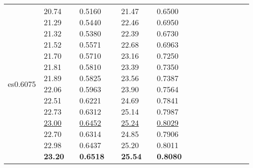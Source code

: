 \documentclass[runningheads]{llncs}
\begin{document}
\begin{table}[!ht]
\begin{tabular}{|p{7em}|p{2.5em}|p{2.5em}|p{3em}|p{2.5em}|p{3em}|p{2.5em}|p{3em}|p{2.5em}|p{3em}|p{2.5em}|p{3em}|}
es{0.6075} & 20.74 \newline{}21.29 \newline{}21.32 \newline{}21.52 \newline{}21.70 \newline{}21.81 \newline{}21.89 \newline{}22.06 \newline{}22.51 \newline{}22.73 \newline{}\underline{23.00} \newline{}22.70 \newline{}22.98 \newline{}\bfseries{23.20} & 0.5160 \newline{}0.5440 \newline{}0.5380 \newline{}0.5571 \newline{}0.5710 \newline{}0.5810 \newline{}0.5825 \newline{}0.5963 \newline{}0.6221 \newline{}0.6312 \newline{}\underline{0.6452} \newline{}0.6314 \newline{}0.6437 \newline{}\bfseries{0.6518} & 21.47 \newline{}22.46 \newline{}22.39 \newline{}22.68 \newline{}23.16 \newline{}23.39 \newline{}23.56 \newline{}23.90 \newline{}24.69 \newline{}25.14 \newline{}\underline{25.24} \newline{}24.85 \newline{}25.20 \newline{}\bfseries{25.54} & 0.6500\newline{} 0.6950\newline{} 0.6730\newline{} 0.6963\newline{} 0.7250\newline{} 0.7350\newline{} 0.7387\newline{} 0.7564\newline{} 0.7841\newline{} 0.7987\newline{} \underline{0.8029} \newline{}0.7906 \newline{}0.8011 \newline{}\bfseries{0.8080}  \\

\end{tabular}
\end{table}
\end{document}
